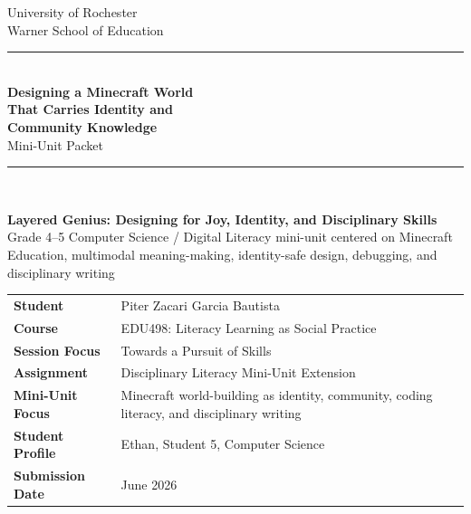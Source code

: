 \begin{titlepage}
\thispagestyle{empty}

\begin{center}
{\large University of Rochester\\}
{\normalsize Warner School of Education\\[0.35in]}

{\color{PrimaryRed}\rule{\textwidth}{1.4pt}}\\[0.22in]
{\Huge\bfseries Designing a Minecraft World\\[0.08in] That Carries Identity and\\[0.08in] Community Knowledge}\\[0.18in]
{\Large Mini-Unit Packet}\\[0.22in]
{\color{PrimaryRed}\rule{0.78\textwidth}{0.7pt}}\\[0.32in]

\colorbox{SoftBlue}{%
\parbox{0.88\textwidth}{%
\centering\vspace{0.12in}
\textbf{Layered Genius: Designing for Joy, Identity, and Disciplinary Skills}\\[0.05in]
Grade 4--5 Computer Science / Digital Literacy mini-unit centered on Minecraft Education, multimodal meaning-making, identity-safe design, debugging, and disciplinary writing
\vspace{0.12in}
}%
}
\end{center}

\vspace{0.38in}

\begin{center}
\renewcommand{\arraystretch}{1.15}
\setlength{\tabcolsep}{4pt}
\begin{tabular}{>{\bfseries\RaggedLeft}p{1.65in} p{4.9in}}
Student & Piter Zacari Garcia Bautista \\
Course & EDU498: Literacy Learning as Social Practice \\
Session Focus & Towards a Pursuit of Skills \\
Assignment & Disciplinary Literacy Mini-Unit Extension \\
Mini-Unit Focus & Minecraft world-building as identity, community, coding literacy, and disciplinary writing \\
Student Profile & Ethan, Student 5, Computer Science \\
Submission Date & June 2026 \\
\end{tabular}
\end{center}


\end{titlepage}
